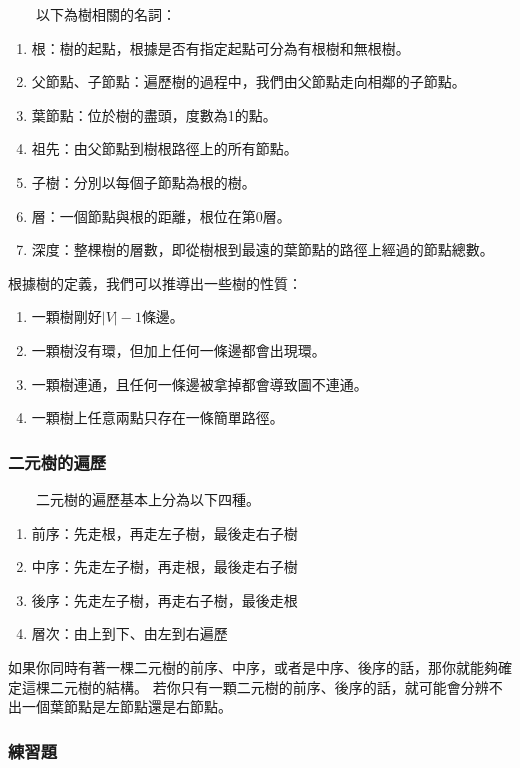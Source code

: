 　　以下為樹相關的名詞：

\begin{enumerate}
\item 根：樹的起點，根據是否有指定起點可分為有根樹和無根樹。
\item 父節點、子節點：遍歷樹的過程中，我們由父節點走向相鄰的子節點。
\item 葉節點：位於樹的盡頭，度數為1的點。
\item 祖先：由父節點到樹根路徑上的所有節點。
\item 子樹：分別以每個子節點為根的樹。
\item 層：一個節點與根的距離，根位在第0層。
\item 深度：整棵樹的層數，即從樹根到最遠的葉節點的路徑上經過的節點總數。
\end{enumerate}

\hspace*{\fill}

根據樹的定義，我們可以推導出一些樹的性質：

\begin{enumerate}
\item 一顆樹剛好$|V|-1$條邊。
\item 一顆樹沒有環，但加上任何一條邊都會出現環。
\item 一顆樹連通，且任何一條邊被拿掉都會導致圖不連通。
\item 一顆樹上任意兩點只存在一條簡單路徑。
\end{enumerate}

\subsubsection{二元樹的遍歷}

　　二元樹的遍歷基本上分為以下四種。
\begin{enumerate}
    \item 前序：先走根，再走左子樹，最後走右子樹
    \item 中序：先走左子樹，再走根，最後走右子樹
    \item 後序：先走左子樹，再走右子樹，最後走根
    \item 層次：由上到下、由左到右遍歷
\end{enumerate}

如果你同時有著一棵二元樹的前序、中序，或者是中序、後序的話，那你就能夠確定這棵二元樹的結構。
若你只有一顆二元樹的前序、後序的話，就可能會分辨不出一個葉節點是左節點還是右節點。

\subsubsection{練習題}

